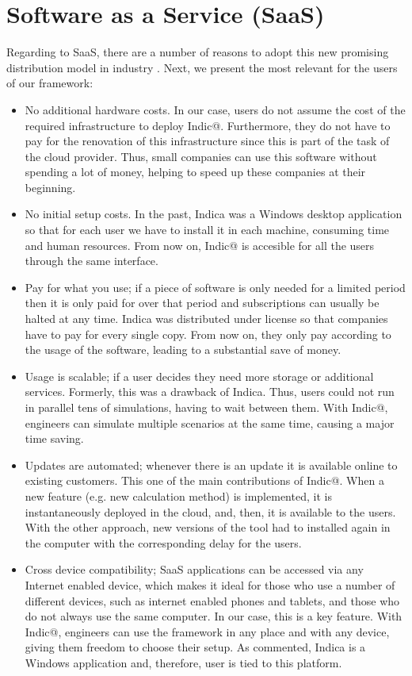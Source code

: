 \section{Software as a Service (SaaS)}
Regarding to SaaS, there are a  number of reasons to adopt this new promising distribution model in industry \cite{}. Next, we present the 
most relevant for the users of our framework:  
    \begin{itemize}		
		\item No additional hardware costs. In our case, users do not assume the cost of the required infrastructure to deploy Indic@. 				Furthermore, they do not have to pay for the renovation of this infrastructure since this is part of the task of the cloud provider. Thus, small companies can use this software without spending a lot of money, helping to speed up these companies at their beginning. 
    \item No initial setup costs. In the past, Indica \cite{} was a Windows desktop application so that for each user we have to install it in each machine, consuming time and human resources. From now on, Indic@ is accesible for all the users through the same interface.  
    \item Pay for what you use; if a piece of software is only needed for a limited period then it is only paid for over that period and subscriptions can usually be halted at any time. Indica was distributed under license so that companies have to pay for every single copy. From now on, they only pay according to the usage of the software, leading to a substantial save of money. 
    \item Usage is scalable; if a user decides they need more storage or additional services. Formerly, this was a drawback of Indica. Thus, users could not run in parallel tens of simulations, having to wait between them. With Indic@, engineers can simulate multiple scenarios at the same time, causing a major time saving.
    \item Updates are automated; whenever there is an update it is available online to existing customers. This one of the main contributions of Indic@. When a new feature (e.g. new calculation method) is implemented, it is instantaneously deployed in the cloud, and, then, it is available to the users. With the other approach, new versions of the tool had to installed again in the computer with the corresponding delay for the users.
    \item Cross device compatibility; SaaS applications can be accessed via any Internet enabled device, which makes it ideal for those who use a number of different devices, such as internet enabled phones and tablets, and those who do not always use the same computer. In our case, this is a key feature. With Indic@, engineers can use the framework in any place and with any device, giving them freedom to choose their setup. As commented, Indica is a Windows application and, therefore, user is tied to this platform.

\end{itemize}
